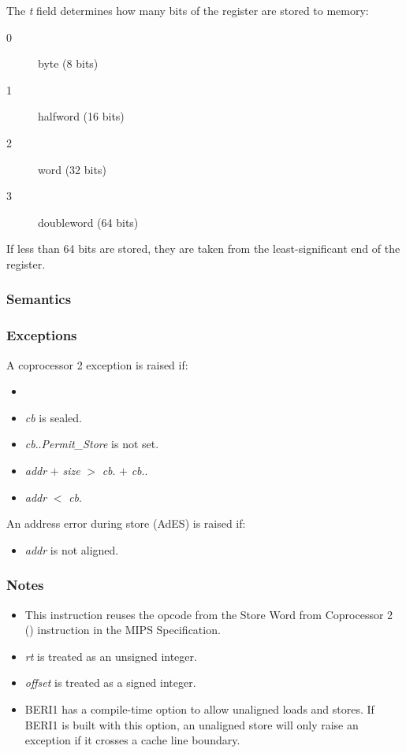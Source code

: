 The \emph{t} field determines how many bits of the register are stored to memory:

\begin{description}
	\item[0] byte (8 bits)
	\item[1] halfword (16 bits)
	\item[2] word (32 bits)
	\item[3] doubleword (64 bits)
\end{description}

If less than 64 bits are stored, they are taken from the least-significant
end of the register.

\subsubsection*{Semantics}

\subsubsection*{Exceptions}

A coprocessor 2 exception is raised if:

\begin{itemize}
\item
\cchecktag{}
\item
\emph{cb} is sealed.
\item
\emph{cb}.\cperms.\emph{Permit\_Store} is not set.
\item
\emph{addr} $+$ \emph{size} $>$ \emph{cb}.\cbase{} $+$ \emph{cb}.\clength{}.
\item
\emph{addr} $<$ \emph{cb}.\cbase{}
\end{itemize}

An address error during store (AdES) is raised if:

\begin{itemize}
\item
\emph{addr} is not aligned.
\end{itemize}

\subsubsection*{Notes}

\begin{itemize}
\item
This instruction reuses the opcode from the Store Word from Coprocessor 2
() instruction in the MIPS Specification.
\item
\emph{rt} is treated as an unsigned integer.
\item
\emph{offset} is treated as a signed integer.
\item
BERI1 has a compile-time option to allow unaligned loads and stores. If BERI1
is built with this option, an unaligned store will only raise an exception if
it crosses a cache line boundary.
\end{itemize}
